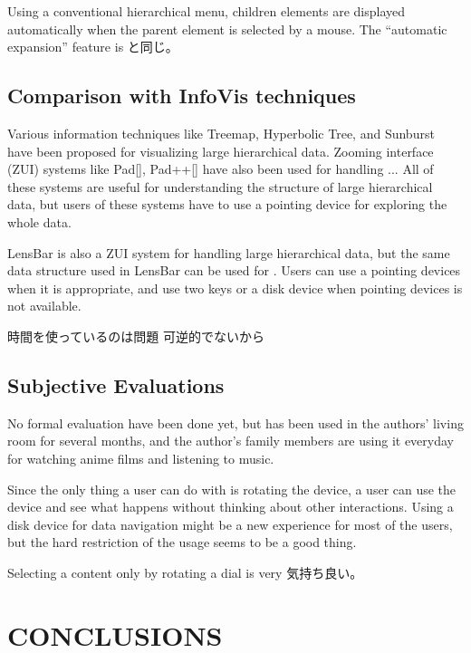 \documentclass{article}
\begin{document}
Using a conventional hierarchical menu, children elements are displayed automatically
when the parent element is selected by a mouse.
The ``automatic expansion'' feature is {\ST}と同じ。

\subsection{Comparison with InfoVis techniques}

Various information techniques like
Treemap\cite{Johnson:1991:TSA:949607.949654},
Hyperbolic Tree\cite{Lamping:1995:FTB:223904.223956},
and Sunburst\cite{Stasko:2000:FDN:857190.857683}
have been proposed for visualizing large hierarchical data.
Zooming interface (ZUI) systems like Pad[], Pad++[]
have also been used for handling ...
All of these systems are useful for understanding the structure of
large hierarchical data, but users of these systems have to use a pointing device
for exploring the whole data.

LensBar\cite{Masui:1998:LVB:647341.721215}
is also a ZUI system for handling large hierarchical data,
but the same data structure used in LensBar can be used for {\ST}.
Users can use a pointing devices when it is appropriate,
and use two keys or a disk device when pointing devices is not available.

時間を使っているのは問題
可逆的でないから

\subsection{Subjective Evaluations}

No formal evaluation have been done yet, but {\ST} has been used in the authors'
living room for several months, and the author's family members are using it
everyday for watching anime films and listening to music.

Since the only thing a user can do with {\ST} is rotating the device,
a user can use the device and see what happens without thinking about
other interactions.
Using a disk device for data navigation might be a new experience for
most of the users, but the hard restriction of the usage seems to be a
good thing.

Selecting a content only by rotating a dial is very 気持ち良い。


\section*{CONCLUSIONS}

\small{


}
\end{document}
